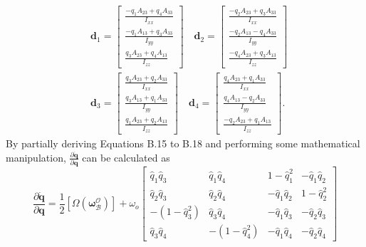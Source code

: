 $$
\begin{aligned}
& \mathbf{d}_{1}=\left[\begin{array}{c}\frac{-q_{1} A_{23}+q_{4} A_{33}}{I_{x x}} \\\frac{-q_{1} A_{13}+q_{3} A_{33}}{I_{y y}} \\\frac{q_{3} A_{23}+q_{4} A_{13}}{I_{z z}}\end{array}\right] \quad \mathbf{d}_{2}=\left[\begin{array}{l}\frac{-q_{2} A_{23}+q_{3} A_{33}}{I_{x x}} \\\frac{-q_{2} A_{13}-q_{4} A_{33}}{I_{y y}} \\\frac{-q_{4} A_{23}+q_{3} A_{13}}{I_{z z}}\end{array}\right] \\
& \mathbf{d}_{3}=\left[\begin{array}{c}\frac{q_{3} A_{23}+q_{2} A_{33}}{I_{x x}} \\\frac{q_{3} A_{13}+q_{1} A_{33}}{I_{y y}} \\\frac{q_{1} A_{23}+q_{2} A_{13}}{I_{z z}}\end{array}\right] \quad \mathbf{d}_{4}=\left[\begin{array}{c}\frac{q_{4} A_{23}+q_{1} A_{33}}{I_{x x}} \\\frac{q_{4} A_{13}-q_{2} A_{33}}{I_{y y}} \\\frac{-q_{2} A_{23}+q_{1} A_{13}}{I_{z z}}\end{array}\right] . 
\end{aligned}
$$
By partially deriving Equations B.15 to B.18 and performing some mathematical manipulation, $\frac{\partial \dot{\mathbf{q}}}{\partial \mathbf{q}}$ can be calculated as
$$
\frac{\partial \dot{\mathbf{q}}}{\partial \mathbf{q}}=\frac{1}{2}\left[\Omega\left(\boldsymbol{\omega}_{\mathcal{B}}^{\mathcal{O}}\right)\right]+\omega_{o}\left[\begin{array}{cccc}
\hat{q}_{1} \hat{q}_{3} & \hat{q}_{1} \hat{q}_{4} & 1-\hat{q}_{1}^{2} & -\hat{q}_{1} \hat{q}_{2} \\
\hat{q}_{2} \hat{q}_{3} & \hat{q}_{2} \hat{q}_{4} & -\hat{q}_{1} \hat{q}_{2} & 1-\hat{q}_{2}^{2} \\
-\left(1-\hat{q}_{3}^{2}\right) & \hat{q}_{3} \hat{q}_{4} & -\hat{q}_{1} \hat{q}_{3} & -\hat{q}_{2} \hat{q}_{3} \\
\hat{q}_{3} \hat{q}_{4} & -\left(1-\hat{q}_{4}^{2}\right) & -\hat{q}_{1} \hat{q}_{4} & -\hat{q}_{2} \hat{q}_{4}
\end{array}\right]
$$

